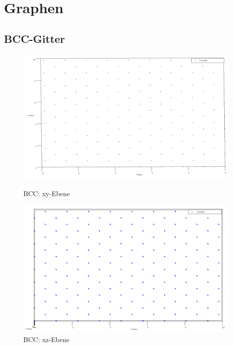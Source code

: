 
\section{Graphen}

\subsection{BCC-Gitter}

\begin{figure}[H]
\begin{minipage}[b]{0.3\textwidth}
    \centering
    \includegraphics[scale=0.12]{data/bcc_x-y.PNG}
    \caption{BCC: xy-Ebene}
    \label{fig:bccxy}
\end{minipage}    
\begin{minipage}[b]{0.3\textwidth}
    \centering
    \includegraphics[scale=0.12]{data/bcc_x-z.PNG}
    \caption{BCC: xz-Ebene}
    \label{fig:bccxz}
\end{minipage} 
\begin{minipage}[b]{0.3\textwidth}

\end{minipage}
\end{figure}
